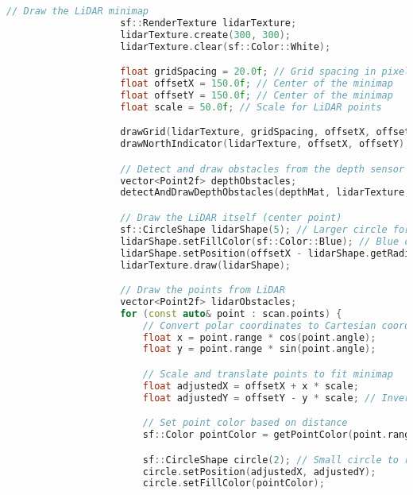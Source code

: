 \begin{lstlisting}[language={C++}, caption={C\'odigo de ejemplo de Kinect y LiDAR}, label={fresd}]
                    // Draw the LiDAR minimap
                    sf::RenderTexture lidarTexture;
                    lidarTexture.create(300, 300);
                    lidarTexture.clear(sf::Color::White);

                    float gridSpacing = 20.0f; // Grid spacing in pixels
                    float offsetX = 150.0f; // Center of the minimap
                    float offsetY = 150.0f; // Center of the minimap
                    float scale = 50.0f; // Scale for LiDAR points

                    drawGrid(lidarTexture, gridSpacing, offsetX, offsetY);
                    drawNorthIndicator(lidarTexture, offsetX, offsetY);

                    // Detect and draw obstacles from the depth sensor
                    vector<Point2f> depthObstacles;
                    detectAndDrawDepthObstacles(depthMat, lidarTexture, offsetX, offsetY, scale, depthObstacles);

                    // Draw the LiDAR itself (center point)
                    sf::CircleShape lidarShape(5); // Larger circle for the center
                    lidarShape.setFillColor(sf::Color::Blue); // Blue color for the center
                    lidarShape.setPosition(offsetX - lidarShape.getRadius(), offsetY - lidarShape.getRadius());
                    lidarTexture.draw(lidarShape);

                    // Draw the points from LiDAR
                    vector<Point2f> lidarObstacles;
                    for (const auto& point : scan.points) {
                        // Convert polar coordinates to Cartesian coordinates
                        float x = point.range * cos(point.angle);
                        float y = point.range * sin(point.angle);

                        // Scale and translate points to fit minimap
                        float adjustedX = offsetX + x * scale;
                        float adjustedY = offsetY - y * scale; // Invert Y to match screen coordinates

                        // Set point color based on distance
                        sf::Color pointColor = getPointColor(point.range, 64.0f); // Assuming max range is 64 meters

                        sf::CircleShape circle(2); // Small circle to represent the point
                        circle.setPosition(adjustedX, adjustedY);
                        circle.setFillColor(pointColor);


\end{lstlisting}
